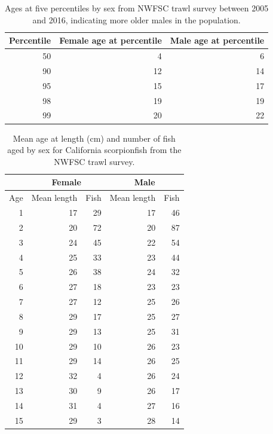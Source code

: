 \documentclass[12pt,]{article}
\begin{document}
\begin{table}[ht]
\centering
\caption{Ages at five percentiles by sex from 
                                          NWFSC trawl survey between 2005 and 2016, 
                                          indicating more older males in the population.} 
\label{tab:Fleet8_NWFSCTrawl_agepercents}
\begin{tabular}{rrr}
  \hline
Percentile & Female age at percentile & Male age at percentile \\ 
  \hline
50 & 4 & 6 \\ 
  90 & 12 & 14 \\ 
  95 & 15 & 17 \\ 
  98 & 19 & 19 \\ 
  99 & 20 & 22 \\ 
   \hline
\end{tabular}
\end{table}\begin{table}[ht]
\centering
\caption{Mean age at length (cm) and number of 
                                                    fish aged by sex for 
                                                    California scorpionfish from the NWFSC
                                                      trawl survey.} 
\label{tab:Fleet8_NWFSCTrawl_meanAatL}
\begin{tabular}{rrrrr}
  &  \multicolumn{2}{c}{Female} 
                                   &  \multicolumn{2}{c}{Male} \\
 \hline
Age & Mean  length & Fish & Mean length & Fish \\ 
  \hline
1 & 17 & 29 & 17 & 46 \\ 
  2 & 20 & 72 & 20 & 87 \\ 
  3 & 24 & 45 & 22 & 54 \\ 
  4 & 25 & 33 & 23 & 44 \\ 
  5 & 26 & 38 & 24 & 32 \\ 
  6 & 27 & 18 & 23 & 23 \\ 
  7 & 27 & 12 & 25 & 26 \\ 
  8 & 29 & 17 & 25 & 27 \\ 
  9 & 29 & 13 & 25 & 31 \\ 
  10 & 29 & 10 & 26 & 23 \\ 
  11 & 29 & 14 & 26 & 25 \\ 
  12 & 32 & 4 & 26 & 24 \\ 
  13 & 30 & 9 & 26 & 17 \\ 
  14 & 31 & 4 & 27 & 16 \\ 
  15 & 29 & 3 & 28 & 14 \\ 

\end{tabular}
\end{table}
\end{document}
